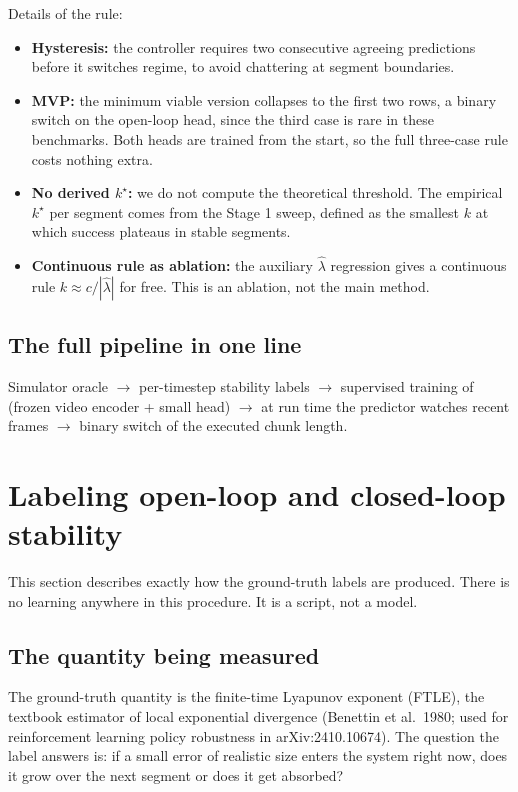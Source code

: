 \documentclass[11pt]{article}
\newcommand{\kstar}{k^{\star}}
\begin{document}
Details of the rule:
\begin{itemize}[leftmargin=2em]
  \item \textbf{Hysteresis:} the controller requires two consecutive agreeing
        predictions before it switches regime, to avoid chattering at segment
        boundaries.
  \item \textbf{MVP:} the minimum viable version collapses to the first two rows, a
        binary switch on the open-loop head, since the third case is rare in these
        benchmarks. Both heads are trained from the start, so the full three-case rule
        costs nothing extra.
  \item \textbf{No derived $\kstar$:} we do not compute the theoretical threshold. The
        empirical $\kstar$ per segment comes from the Stage 1 sweep, defined as the
        smallest $k$ at which success plateaus in stable segments.
  \item \textbf{Continuous rule as ablation:} the auxiliary $\hat\lambda$ regression
        gives a continuous rule $k \approx c/|\hat\lambda|$ for free. This is an
        ablation, not the main method.
\end{itemize}

\subsection{The full pipeline in one line}

Simulator oracle $\rightarrow$ per-timestep stability labels $\rightarrow$ supervised
training of (frozen video encoder + small head) $\rightarrow$ at run time the predictor
watches recent frames $\rightarrow$ binary switch of the executed chunk length.

\section{Labeling open-loop and closed-loop stability}
\label{sec:labels}

This section describes exactly how the ground-truth labels are produced. There is no
learning anywhere in this procedure. It is a script, not a model.

\subsection{The quantity being measured}

The ground-truth quantity is the finite-time Lyapunov exponent (FTLE), the textbook
estimator of local exponential divergence (Benettin et al.\ 1980; used for reinforcement
learning policy robustness in arXiv:2410.10674). The question the label answers is: if a
small error of realistic size enters the system right now, does it grow over the next
segment or does it get absorbed?
\end{document}
